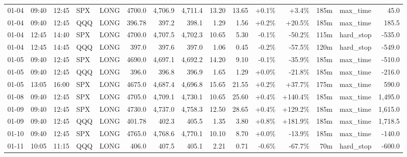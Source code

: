 \documentclass[11pt,a4paper,twoside]{article}
\begin{document}
\begin{landscape}
\begin{center}
\begin{longtable}{>{\color{txtmain}}l l l l l r r r r r r r r >{\color{txtmain}}l r}
01-04 & 09:40 & 12:45 & SPX & LONG & 4700.0 & 4,706.9 & 4,711.4 & 13.20 & 13.65 & \textcolor{wingreen}{+0.1\%} & \textcolor{wingreen}{+3.4\%} & 185m & max\_time & \textcolor{wingreen}{45.0} \\
01-04 & 09:40 & 12:45 & QQQ & LONG & 396.78 & 397.2 & 398.1 & 1.29 & 1.56 & \textcolor{wingreen}{+0.2\%} & \textcolor{wingreen}{+20.5\%} & 185m & max\_time & \textcolor{wingreen}{185.5} \\
01-04 & 12:45 & 14:40 & SPX & LONG & 4700.0 & 4,707.5 & 4,702.3 & 10.65 & 5.30 & \textcolor{lossred}{-0.1\%} & \textcolor{lossred}{-50.2\%} & 115m & hard\_stop & \textcolor{lossred}{-535.0} \\
01-04 & 12:45 & 14:45 & QQQ & LONG & 397.0 & 397.6 & 397.0 & 1.06 & 0.45 & \textcolor{lossred}{-0.2\%} & \textcolor{lossred}{-57.5\%} & 120m & hard\_stop & \textcolor{lossred}{-549.0} \\
01-05 & 09:40 & 12:45 & SPX & LONG & 4690.0 & 4,697.1 & 4,692.2 & 14.20 & 9.10 & \textcolor{lossred}{-0.1\%} & \textcolor{lossred}{-35.9\%} & 185m & max\_time & \textcolor{lossred}{-510.0} \\
01-05 & 09:40 & 12:45 & QQQ & LONG & 396.0 & 396.8 & 396.9 & 1.65 & 1.29 & \textcolor{wingreen}{+0.0\%} & \textcolor{lossred}{-21.8\%} & 185m & max\_time & \textcolor{lossred}{-216.0} \\
01-05 & 13:05 & 16:00 & SPX & LONG & 4675.0 & 4,687.4 & 4,696.8 & 15.65 & 21.55 & \textcolor{wingreen}{+0.2\%} & \textcolor{wingreen}{+37.7\%} & 175m & max\_time & \textcolor{wingreen}{590.0} \\
01-08 & 09:40 & 12:45 & SPX & LONG & 4705.0 & 4,709.1 & 4,730.1 & 10.65 & 25.60 & \textcolor{wingreen}{+0.4\%} & \textcolor{wingreen}{+140.4\%} & 185m & max\_time & \textcolor{wingreen}{1,495.0} \\
01-09 & 09:40 & 12:45 & SPX & LONG & 4730.0 & 4,737.0 & 4,758.3 & 12.50 & 28.65 & \textcolor{wingreen}{+0.4\%} & \textcolor{wingreen}{+129.2\%} & 185m & max\_time & \textcolor{wingreen}{1,615.0} \\
01-09 & 09:40 & 12:45 & QQQ & LONG & 401.78 & 402.3 & 405.5 & 1.35 & 3.80 & \textcolor{wingreen}{+0.8\%} & \textcolor{wingreen}{+181.9\%} & 185m & max\_time & \textcolor{wingreen}{1,718.5} \\
01-10 & 09:40 & 12:45 & SPX & LONG & 4765.0 & 4,768.6 & 4,770.1 & 10.10 & 8.70 & \textcolor{wingreen}{+0.0\%} & \textcolor{lossred}{-13.9\%} & 185m & max\_time & \textcolor{lossred}{-140.0} \\
01-11 & 10:05 & 11:15 & QQQ & LONG & 406.0 & 407.5 & 405.1 & 2.21 & 0.71 & \textcolor{lossred}{-0.6\%} & \textcolor{lossred}{-67.7\%} & 70m & hard\_stop & \textcolor{lossred}{-600.0} \\

\end{longtable}
\end{center}
\end{landscape}
\end{document}
